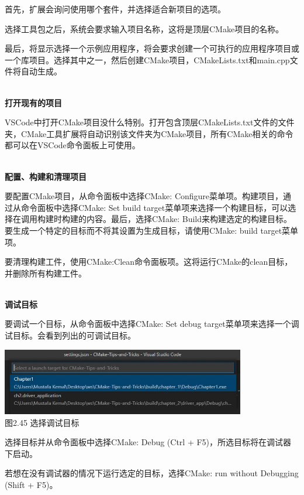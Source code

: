 首先，扩展会询问使用哪个套件，并选择适合新项目的选项。

选择工具包之后，系统会要求输入项目名称，这将是顶层CMake项目的名称。

最后，将显示选择一个示例应用程序，将会要求创建一个可执行的应用程序项目或一个库项目。选择其中之一，然后创建CMake项目，CMakeLists.txt和main.cpp文件将自动生成。

\hspace*{\fill} \\ %
\noindent
\textbf{打开现有的项目}

VSCode中打开CMake项目没什么特别。打开包含顶层CMakeLists.txt文件的文件夹，CMake工具扩展将自动识别该文件夹为CMake项目，所有CMake相关的命令都可以在VSCode命令面板上可使用。

\hspace*{\fill} \\ %
\noindent
\textbf{配置、构建和清理项目}

要配置CMake项目，从命令面板中选择CMake: Configure菜单项。构建项目，通过从命令面板中选择CMake: Set build target菜单项来选择一个构建目标，可以选择在调用构建时构建的内容。最后，选择CMake: Build来构建选定的构建目标。要生成一个特定的目标而不将其设置为生成目标，请使用CMake: build target菜单项。

要清理构建工件，使用CMake:Clean命令面板项。这将运行CMake的clean目标，并删除所有构建工件。

\hspace*{\fill} \\ %
\noindent
\textbf{调试目标}

要调试一个目标，从命令面板中选择CMake: Set debug target菜单项来选择一个调试目标。会看到列出的可调试目标。

\begin{center}
\includegraphics[width=0.8\textwidth]{content/1/chapter2/images/45.jpg}\\
图2.45 选择调试目标
\end{center}

选择目标并从命令面板中选择CMake: Debug (Ctrl + F5)，所选目标将在调试器下启动。

若想在没有调试器的情况下运行选定的目标，选择CMake: run without Debugging (Shift + F5)。

